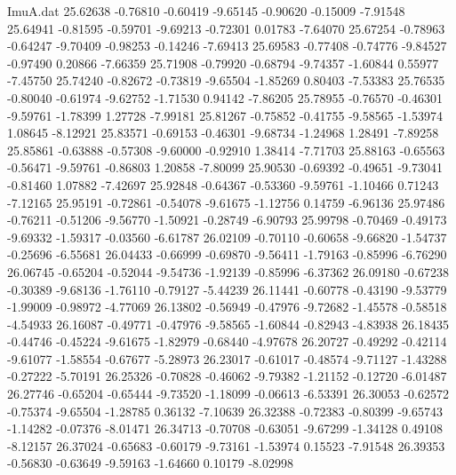 \begin{filecontents}{ImuA.dat}
  25.62638   -0.76810   -0.60419   -9.65145   -0.90620   -0.15009   -7.91548
  25.64941   -0.81595   -0.59701   -9.69213   -0.72301    0.01783   -7.64070
  25.67254   -0.78963   -0.64247   -9.70409   -0.98253   -0.14246   -7.69413
  25.69583   -0.77408   -0.74776   -9.84527   -0.97490    0.20866   -7.66359
  25.71908   -0.79920   -0.68794   -9.74357   -1.60844    0.55977   -7.45750
  25.74240   -0.82672   -0.73819   -9.65504   -1.85269    0.80403   -7.53383
  25.76535   -0.80040   -0.61974   -9.62752   -1.71530    0.94142   -7.86205
  25.78955   -0.76570   -0.46301   -9.59761   -1.78399    1.27728   -7.99181
  25.81267   -0.75852   -0.41755   -9.58565   -1.53974    1.08645   -8.12921
  25.83571   -0.69153   -0.46301   -9.68734   -1.24968    1.28491   -7.89258
  25.85861   -0.63888   -0.57308   -9.60000   -0.92910    1.38414   -7.71703
  25.88163   -0.65563   -0.56471   -9.59761   -0.86803    1.20858   -7.80099
  25.90530   -0.69392   -0.49651   -9.73041   -0.81460    1.07882   -7.42697
  25.92848   -0.64367   -0.53360   -9.59761   -1.10466    0.71243   -7.12165
  25.95191   -0.72861   -0.54078   -9.61675   -1.12756    0.14759   -6.96136
  25.97486   -0.76211   -0.51206   -9.56770   -1.50921   -0.28749   -6.90793
  25.99798   -0.70469   -0.49173   -9.69332   -1.59317   -0.03560   -6.61787
  26.02109   -0.70110   -0.60658   -9.66820   -1.54737   -0.25696   -6.55681
  26.04433   -0.66999   -0.69870   -9.56411   -1.79163   -0.85996   -6.76290
  26.06745   -0.65204   -0.52044   -9.54736   -1.92139   -0.85996   -6.37362
  26.09180   -0.67238   -0.30389   -9.68136   -1.76110   -0.79127   -5.44239
  26.11441   -0.60778   -0.43190   -9.53779   -1.99009   -0.98972   -4.77069
  26.13802   -0.56949   -0.47976   -9.72682   -1.45578   -0.58518   -4.54933
  26.16087   -0.49771   -0.47976   -9.58565   -1.60844   -0.82943   -4.83938
  26.18435   -0.44746   -0.45224   -9.61675   -1.82979   -0.68440   -4.97678
  26.20727   -0.49292   -0.42114   -9.61077   -1.58554   -0.67677   -5.28973
  26.23017   -0.61017   -0.48574   -9.71127   -1.43288   -0.27222   -5.70191
  26.25326   -0.70828   -0.46062   -9.79382   -1.21152   -0.12720   -6.01487
  26.27746   -0.65204   -0.65444   -9.73520   -1.18099   -0.06613   -6.53391
  26.30053   -0.62572   -0.75374   -9.65504   -1.28785    0.36132   -7.10639
  26.32388   -0.72383   -0.80399   -9.65743   -1.14282   -0.07376   -8.01471
  26.34713   -0.70708   -0.63051   -9.67299   -1.34128    0.49108   -8.12157
  26.37024   -0.65683   -0.60179   -9.73161   -1.53974    0.15523   -7.91548
  26.39353   -0.56830   -0.63649   -9.59163   -1.64660    0.10179   -8.02998

\end{filecontents}
